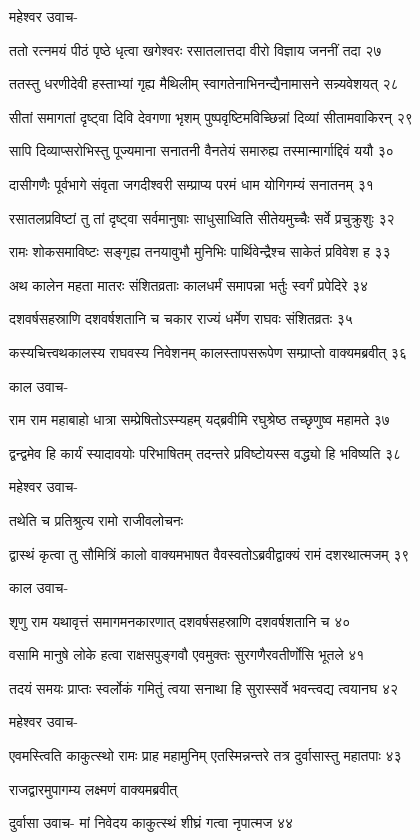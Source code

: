 महेश्वर उवाच-

ततो रत्नमयं पीठं पृष्ठे धृत्वा खगेश्वरः
रसातलात्तदा वीरो विज्ञाय जननीं तदा २७

ततस्तु धरणीदेवी हस्ताभ्यां गृह्य मैथिलीम्
स्वागतेनाभिनन्द्यैनामासने सन्न्यवेशयत् २८

सीतां समागतां दृष्ट्वा दिवि देवगणा भृशम्
पुष्पवृष्टिमविच्छिन्नां दिव्यां सीतामवाकिरन् २९

सापि दिव्याप्सरोभिस्तु पूज्यमाना सनातनी
वैनतेयं समारुह्य तस्मान्मार्गाद्दिवं ययौ ३०

दासीगणैः पूर्वभागे संवृता जगदीश्वरी
सम्प्राप्य परमं धाम योगिगम्यं सनातनम् ३१

रसातलप्रविष्टां तु तां दृष्ट्वा सर्वमानुषाः
साधुसाध्विति सीतेयमुच्चैः सर्वे प्रचुक्रुशुः ३२

रामः शोकसमाविष्टः सङ्गृह्य तनयावुभौ
मुनिभिः पार्थिवेन्द्रैश्च साकेतं प्रविवेश ह ३३

अथ कालेन महता मातरः संशितव्रताः
कालधर्मं समापन्ना भर्तुः स्वर्गं प्रपेदिरे ३४

दशवर्षसहस्राणि दशवर्षशतानि च
चकार राज्यं धर्मेण राघवः संशितव्रतः ३५

कस्यचित्त्वथकालस्य राघवस्य निवेशनम्
कालस्तापसरूपेण सम्प्राप्तो वाक्यमब्रवीत् ३६

काल उवाच-

राम राम महाबाहो धात्रा सम्प्रेषितोऽस्म्यहम्
यद्ब्रवीमि रघुश्रेष्ठ तच्छृणुष्व महामते ३७

द्वन्द्वमेव हि कार्यं स्यादावयोः परिभाषितम्
तदन्तरे प्रविष्टोयस्स वद्ध्यो हि भविष्यति ३८

महेश्वर उवाच-

तथेति च प्रतिश्रुत्य रामो राजीवलोचनः

द्वास्थं कृत्वा तु सौमित्रिं कालो वाक्यमभाषत
वैवस्वतोऽब्रवीद्वाक्यं रामं दशरथात्मजम् ३९

काल उवाच-

शृणु राम यथावृत्तं समागमनकारणात्
दशवर्षसहस्राणि दशवर्षशतानि च ४०

वसामि मानुषे लोके हत्वा राक्षसपुङ्गवौ
एवमुक्तः सुरगणैरवतीर्णोसि भूतले ४१

तदयं समयः प्राप्तः स्वर्लोकं गमितुं त्वया
सनाथा हि सुरास्सर्वे भवन्त्वद्य त्वयानघ ४२

महेश्वर उवाच-

एवमस्त्विति काकुत्स्थो रामः प्राह महामुनिम्
एतस्मिन्नन्तरे तत्र दुर्वासास्तु महातपाः ४३

राजद्वारमुपागम्य लक्ष्मणं वाक्यमब्रवीत्

दुर्वासा उवाच-
मां निवेदय काकुत्स्थं शीघ्रं गत्वा नृपात्मज ४४

